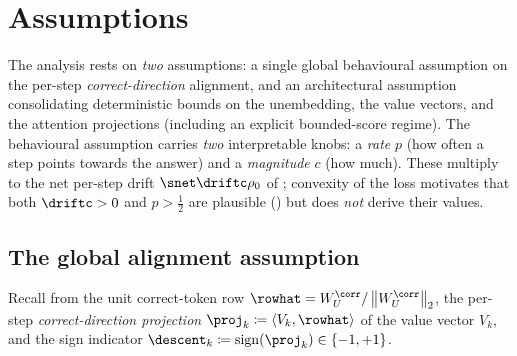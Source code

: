 \section{Assumptions}
\label{sec:assumptions}

The analysis rests on \emph{two} assumptions: a single global behavioural
assumption  on the per-step \emph{correct-direction}
alignment, and an architectural assumption 
consolidating deterministic bounds on the unembedding, the value vectors,
and the attention projections (including an explicit bounded-score regime).
The behavioural assumption carries \emph{two} interpretable knobs: a
\emph{rate} $p$ (how often a step points towards the answer) and a
\emph{magnitude} $c$ (how much). These multiply to the net per-step drift
$\snet\driftc\rho_0$ of ; convexity of the loss
motivates that both $\driftc>0$ and $p>\tfrac12$ are plausible
() but does \emph{not} derive their values.

\subsection{The global alignment assumption}
\label{subsec:descent}

Recall from  the unit correct-token row
$\rowhat=W_U^{\corr}/\norm{W_U^{\corr}}_2$, the per-step
\emph{correct-direction projection}
$\proj_k\coloneqq\inner{V_k}{\rowhat}$ of the value vector $V_k$, and the
sign indicator $\descent_k\coloneqq\operatorname{sign}(\proj_k)\in\{-1,+1\}$.

